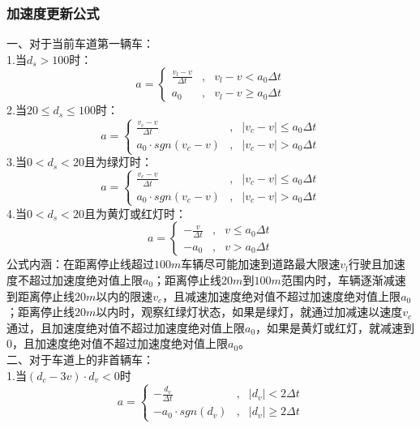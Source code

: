 \documentclass[a4paper,12pt]{article}
\numberwithin{equation}{section}
\newcommand{\upcite}[1]{\textsuperscript{\textsuperscript{\cite{#1}}}}
\begin{document}
	\subsubsection{加速度更新公式}
	\noindent 一、对于当前车道第一辆车：\\
	1.当$d_s>100$时： 
	\begin{equation}
		a=\left\{\begin{array}{lll}
			\frac{v_l-v}{\Delta t}&,&v_l-v<a_0\Delta t\\
			a_0&,&v_l-v\geq a_0\Delta t
		\end{array}\right.
	\end{equation}
	2.当$20\leq d_s\leq 100$时：
	\begin{equation}
		a=\left\{\begin{array}{lll}
		\frac{v_c-v}{\Delta t}&,&\lvert v_c-v\rvert \leq a_0\Delta t\\
		a_0\cdot sgn(v_c-v)&,&\lvert v_c-v\rvert > a_0\Delta t
	\end{array}\right.
\end{equation}
	3.当$0< d_s< 20$且为绿灯时：
	\begin{equation}
		a=\left\{\begin{array}{lll}
		\frac{v_c-v}{\Delta t}&,&\lvert v_c-v\rvert \leq a_0\Delta t\\
		a_0\cdot sgn(v_c-v)&,&\lvert v_c-v\rvert > a_0\Delta t
	\end{array}\right.
\end{equation}
	4.当$0< d_s< 20$且为黄灯或红灯时：
	\begin{equation}
		a=\left\{\begin{array}{lll}
		-\frac{v}{\Delta t}&,&v \leq a_0\Delta t\\
		-a_0&,&v > a_0\Delta t
	\end{array}\right.
\end{equation}
公式内涵：在距离停止线超过$100m$车辆尽可能加速到道路最大限速$v_l$行驶且加速度不超过加速度绝对值上限$a_0$；距离停止线$20m$到$100m$范围内时，车辆逐渐减速到距离停止线$20m$以内的限速$v_c$，且减速加速度绝对值不超过加速度绝对值上限$a_0$；距离停止线$20m$以内时，观察红绿灯状态，如果是绿灯，就通过加减速以速度$v_c$通过，且加速度绝对值不超过加速度绝对值上限$a_0$，如果是黄灯或红灯，就减速到$0$，且加速度绝对值不超过加速度绝对值上限$a_0$。\upcite{ref7,ref8}\\
	二、对于车道上的非首辆车：\\
	1.当$(d_c-3v)\cdot d_v<0$时
	\begin{equation}
		a=\left\{\begin{array}{lll}
	-\frac{d_v}{\Delta t}&,&\lvert d_v\rvert<2\Delta t\\
	-a_0\cdot sgn(d_v)&,&\lvert d_v\rvert\geq 2\Delta t
	\end{array}\right.
\end{equation}
\end{document}
